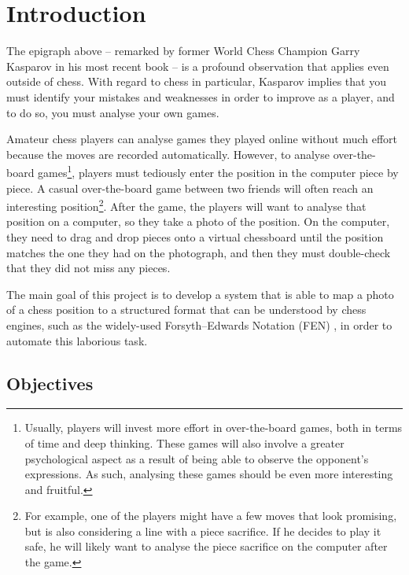 \documentclass[../main.tex]{subfiles}
\begin{document}
\chapter{Introduction}

The epigraph above -- remarked by former World Chess Champion Garry Kasparov in his most recent book \cite{kasparov2018} -- is a profound observation that applies even outside of chess.
With regard to chess in particular, Kasparov implies that you must identify your mistakes and weaknesses in order to improve as a player, and to do so, you must analyse your own games. 

Amateur chess players can analyse games they played online without much effort because the moves are recorded automatically.
However, to analyse over-the-board games\footnote{Usually, players will invest more effort in over-the-board games, both in terms of time and deep thinking. These games will also involve a greater psychological aspect as a result of being able to observe the opponent's expressions. As such, analysing these games should be even more interesting and fruitful.}, players must tediously enter the position in the computer piece by piece.
A casual over-the-board game between two friends will often reach an interesting position\footnote{For example, one of the players might have a few moves that look promising, but is also considering a line with a piece sacrifice. If he decides to play it safe, he will likely want to analyse the piece sacrifice on the computer after the game.}. 
After the game, the players will want to analyse that position on a computer, so they take a photo of the position. 
On the computer, they need to drag and drop pieces onto a virtual chessboard until the position matches the one they had on the photograph, and then they must double-check that they did not miss any pieces.

The main goal of this project is to develop a system that is able to map a photo of a chess position to a structured format that can be understood by chess engines, such as the widely-used Forsyth–Edwards Notation (FEN) \cite{edwards1994}, in order to automate this laborious task.



% 

\section{Objectives}
\label{sec:objectives}
\end{document}
